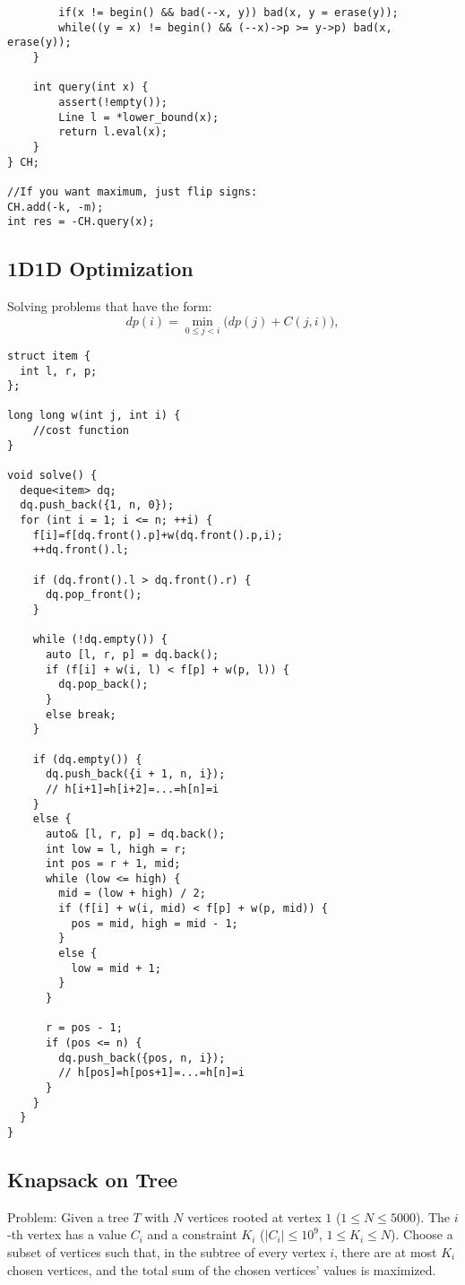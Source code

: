 \documentclass[11pt,a4paper]{article}
\begin{document}
\begin{multicols*}{2}
\begin{lstlisting}
        if(x != begin() && bad(--x, y)) bad(x, y = erase(y));
        while((y = x) != begin() && (--x)->p >= y->p) bad(x, erase(y));
    }

    int query(int x) {
        assert(!empty());
        Line l = *lower_bound(x);
        return l.eval(x);
    }
} CH;

//If you want maximum, just flip signs: 
CH.add(-k, -m);
int res = -CH.query(x);
\end{lstlisting}

\subsection{1D1D Optimization}
Solving problems that have the form: 
\[
dp(i) = \min_{0 \leq j < i} \Big( dp(j) + C(j, i) \Big),
\]
\begin{lstlisting}
struct item {
  int l, r, p;
};

long long w(int j, int i) {
    //cost function
}

void solve() {
  deque<item> dq;
  dq.push_back({1, n, 0});
  for (int i = 1; i <= n; ++i) {
    f[i]=f[dq.front().p]+w(dq.front().p,i);
    ++dq.front().l;

    if (dq.front().l > dq.front().r) {
      dq.pop_front();
    }

    while (!dq.empty()) {
      auto [l, r, p] = dq.back();
      if (f[i] + w(i, l) < f[p] + w(p, l)) {
        dq.pop_back();
      }
      else break;
    }

    if (dq.empty()) {
      dq.push_back({i + 1, n, i});
      // h[i+1]=h[i+2]=...=h[n]=i
    }
    else {
      auto& [l, r, p] = dq.back();
      int low = l, high = r;
      int pos = r + 1, mid;
      while (low <= high) {
        mid = (low + high) / 2;
        if (f[i] + w(i, mid) < f[p] + w(p, mid)) {
          pos = mid, high = mid - 1;
        }
        else {
          low = mid + 1;
        }
      }

      r = pos - 1;
      if (pos <= n) {
        dq.push_back({pos, n, i});
        // h[pos]=h[pos+1]=...=h[n]=i
      }
    }
  }
}
\end{lstlisting}


\subsection{Knapsack on Tree}
Problem: Given a tree $T$ with $N$ vertices rooted at vertex $1$ 
($1 \leq N \leq 5000$). 
The $i$-th vertex has a value $C_i$ and a constraint $K_i$ 
($|C_i| \leq 10^9$, $1 \leq K_i \leq N$). 
Choose a subset of vertices such that, in the subtree of every vertex $i$, 
there are at most $K_i$ chosen vertices, and the total sum of the chosen 
vertices' values is maximized.


\end{multicols*}
\end{document}

